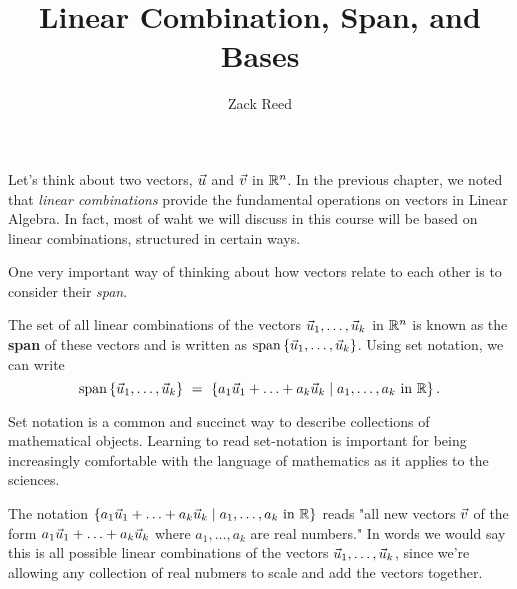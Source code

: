 \documentclass{ximera}
\author{Zack Reed}
\title{Linear Combination, Span, and Bases}
\begin{document}
\begin{abstract}

\end{abstract}
\maketitle

Let's think about two vectors, $\vec{u}$ and $\vec{v}$ in $\mathbb{R}^n$. In the previous chapter, we noted that \emph{linear combinations} provide the fundamental operations on vectors in Linear Algebra. In fact, most of waht we will discuss in this course will be based on linear combinations, structured in certain ways.

\begin{exploration}

One very important way of thinking about how vectors relate to each other is to consider their \emph{span}.


\begin{definition}
  The set of all linear combinations of the vectors
  $\vec{u}_1, \ldots,\vec{u}_k$ in $\mathbb{R}^n$ is known as the
  \textbf{span}%
   of these vectors and is written as
  $\text{span}\left\{\vec{u}_1,\ldots,\vec{u}_k\right\}$. Using set notation, we
  can write
  \begin{equation*}
    \text{span}\left\{\vec{u}_1,\ldots,\vec{u}_k\right\}
    ~=~ \left\{a_1\vec{u}_1+\ldots+a_k\vec{u}_k \mid a_1,\ldots,a_k\text{ in }\mathbb{R}\right\}.
  \end{equation*}
  \begin{hint}
  
    Set notation is a common and succinct way to describe collections of mathematical objects. Learning to read set-notation is important for being increasingly comfortable with the language of mathematics as it applies to the sciences.

    The notation $\left\{a_1\vec{u}_1+\ldots+a_k\vec{u}_k \mid a_1,\ldots,a_k\text{ in }\mathbb{R}\right\}$ reads "all new vectors $\vec{v}$ of the form $a_1\vec{u}_1+\ldots+a_k\vec{u}_k$ where $a_1,\ldots,a_k$ are real numbers." In words we would say this is all possible linear combinations of the vectors $\vec{u}_1,\ldots,\vec{u}_k$, since we're allowing any collection of real nubmers to scale and add the vectors together.

  \end{hint}
\end{definition}


\end{exploration}
\end{document}
